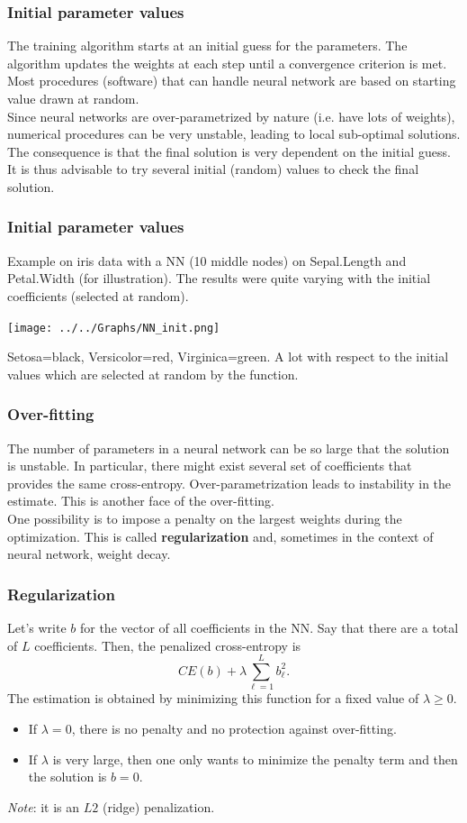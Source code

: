 \begin{frame}
\frametitle{Initial parameter values}
The training algorithm starts at an initial guess for the parameters. The algorithm updates the weights at each step until a convergence criterion is met.\\ 
\vspace{0.3cm}
Most procedures (software) that can handle neural network are based on starting value drawn at random.\\
\vspace{0.3cm}
Since neural networks are over-parametrized by nature (i.e. have lots of weights), numerical procedures can be very unstable, leading to local sub-optimal solutions. The consequence is that the final solution is very dependent on the initial guess. \\
\vspace{0.3cm}
It is thus advisable to try several initial (random) values to check the final solution.
\end{frame}
\begin{frame}
\frametitle{Initial parameter values}
\small Example on iris data with a NN (10 middle nodes) on Sepal.Length and Petal.Width (for illustration). The results were quite varying with the initial coefficients (selected at random).
\begin{center}
\texttt{[image: ../../Graphs/NN\_init.png]}
\end{center} 
Setosa=black, Versicolor=red, Virginica=green. A lot with respect to the initial values which are selected at random by the function.
\end{frame}
\begin{frame}
\frametitle{Over-fitting}
The number of parameters in a neural network can be so large that the solution is unstable. In particular, there might exist several set of coefficients that provides the same cross-entropy. Over-parametrization leads to instability in the estimate. This is another face of the over-fitting. \\
\vspace{0.3cm}
One possibility is to impose a penalty on the largest weights during the optimization. This is called {\bf regularization} and, sometimes in the context of neural network, weight decay.
\end{frame}
\begin{frame}
\frametitle{Regularization}
Let's write $b$ for the vector of all coefficients in the NN. Say that there are a total of $L$ coefficients. Then, the penalized cross-entropy is
$$
CE(b) + \lambda \sum_{\ell=1}^L b_{\ell}^2.
$$ 
The estimation is obtained by minimizing this function for a fixed value of $\lambda\geq 0$. 
\begin{itemize}
\item If $\lambda=0$, there is no penalty and no protection against over-fitting.
\item If $\lambda$ is very large, then one only wants to minimize the penalty term and then the solution is $b=0$.
\end{itemize}
{\it Note}: it is an $L2$ (ridge) penalization.
\end{frame}
